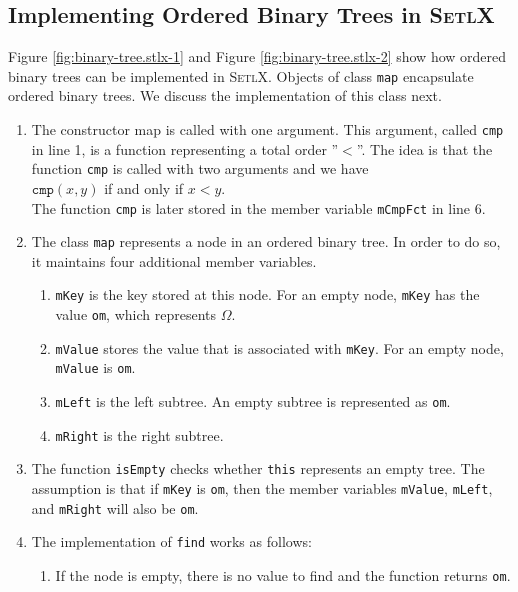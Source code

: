 \subsection{Implementing Ordered Binary Trees in \textsc{SetlX}}
Figure \ref{fig:binary-tree.stlx-1} and Figure \ref{fig:binary-tree.stlx-2} show how ordered binary
trees can be implemented in \textsc{SetlX}.  Objects of class \texttt{map} encapsulate ordered
binary trees.  We discuss the implementation of this class next.
\begin{enumerate}
\item The constructor map is called with one argument.  This argument, called \texttt{cmp}
      in line 1, is a function representing a total order ''$<$''.  The idea is that the function
      \texttt{cmp} is called with two arguments and we have
      \\[0.2cm]
      \hspace*{1.3cm}
      $\mathtt{cmp}(x,y)$ \quad if and only if \quad $x < y$.
      \\[0.2cm]
      The function \texttt{cmp} is later stored in the member variable \texttt{mCmpFct} in line 6.
\item The class \texttt{map} represents a node in an ordered binary tree.  In order to do so, it
      maintains four additional member variables.
      \begin{enumerate}
      \item \texttt{mKey} is the key stored at this node.  For an empty node, \texttt{mKey}
            has the value \texttt{om}, which represents $\Omega$.
      \item \texttt{mValue} stores the value that is associated with \texttt{mKey}.  For an empty node,
            \texttt{mValue} is \texttt{om}.
      \item \texttt{mLeft} is the left subtree.  An empty subtree is represented as \texttt{om}.
      \item \texttt{mRight} is the right subtree.  
      \end{enumerate}
\item The function \texttt{isEmpty} checks whether \texttt{this} represents an empty tree.
      The assumption is that if \texttt{mKey} is \texttt{om}, then the member variables
      \texttt{mValue}, \texttt{mLeft}, and \texttt{mRight} will also be \texttt{om}.
\item The implementation of \texttt{find} works as follows:
      \begin{enumerate}
      \item If the node is empty, there is no value to find and the function returns \texttt{om}.

\end{enumerate}
\end{enumerate}
